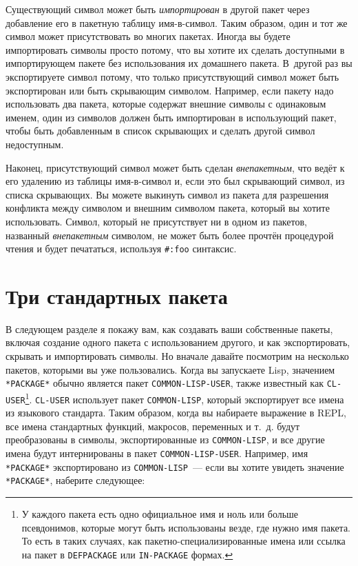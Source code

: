Существующий символ может быть \textit{импортирован} в другой пакет через добавление его в
пакетную таблицу имя-в-символ.  Таким образом, один и тот же символ может присутствовать
во многих пакетах. Иногда вы будете импортировать символы просто потому, что вы хотите их
сделать доступными в импортирующем пакете без использования их домашнего пакета. В~другой
раз вы экспортируете символ потому, что только присутствующий символ может быть
экспортирован или быть скрывающим символом. Например, если пакету надо использовать два
пакета, которые содержат внешние символы с одинаковым именем, один из символов должен быть
импортирован в ис\-поль\-зую\-щий пакет, чтобы быть добавленным в список скрывающих и сделать
другой символ недоступным.

Наконец, присутствующий символ может быть сделан \textit{внепакетным}, что ведёт к его
удалению из таблицы имя-в-символ и, если это был скрывающий символ, из списка скрывающих.
Вы можете выкинуть символ из пакета для разрешения конфликта между символом и внешним
символом пакета, который вы хотите использовать. Символ, который не присутствует ни в
одном из пакетов, названный \textit{внепакетным} символом, не может быть более прочтён
процедурой чтения и будет печататься, используя \lstinline!#:foo! синтаксис.

\section{Три стандартных пакета}
 
В следующем разделе я покажу вам, как создавать ваши собственные пакеты, включая создание
одного пакета с использованием другого, и как экспортировать, скрывать и импортировать
символы. Но вначале давайте посмотрим на несколько пакетов, которыми вы уже
пользовались. Когда вы запускаете Lisp, значением \lstinline{*PACKAGE*} обычно является пакет
\lstinline{COMMON-LISP-USER}, также известный как \lstinline{CL-USER}\footnote{У каждого пакета
  есть одно официальное имя и ноль или больше псевдонимов, которые могут быть использованы
  везде, где нужно имя пакета. То есть в таких случаях, как пакетно-специализированные
  имена или ссылка на пакет в \lstinline{DEFPACKAGE} или \lstinline{IN-PACKAGE} формах.}.
\lstinline{CL-USER} использует пакет \lstinline{COMMON-LISP}, который экспортирует все имена из
языкового стандарта. Таким образом, когда вы набираете выражение в REPL, все имена
стандартных функций, макросов, переменных и т.~д. будут преобразованы в символы,
экспортированные из \lstinline{COMMON-LISP}, и все другие имена будут интернированы в пакет
\lstinline{COMMON-LISP-USER}. Например, имя \lstinline{*PACKAGE*} экспортировано из
\lstinline{COMMON-LISP}~--- если вы хотите увидеть значение \lstinline{*PACKAGE*}, наберите
следующее:

